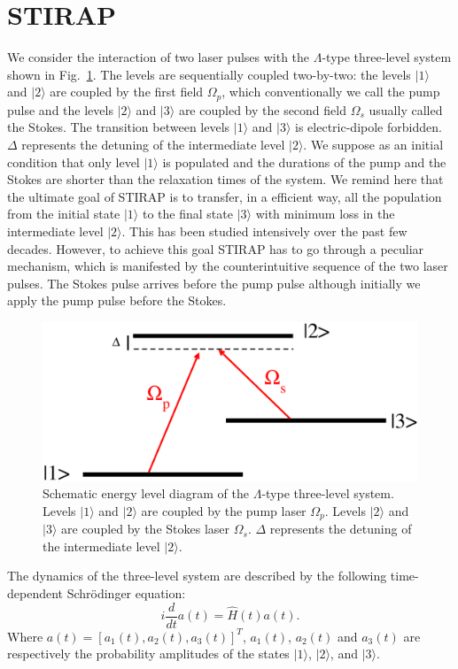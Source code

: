 \documentclass[]{interact}
\theoremstyle{plain}%
\theoremstyle{definition}
\theoremstyle{remark}
\begin{document}
\section{STIRAP}
We consider the interaction of two laser pulses with the $\Lambda$-type 
three-level system shown in Fig.~\ref{fig:lambda_system}. The levels are
sequentially coupled two-by-two: the levels 
$|1\rangle$ and $|2\rangle$ are coupled by the first field  $\Omega_p$, 
which conventionally we call the pump pulse and the levels $|2\rangle$ and 
$|3\rangle$ 
are coupled by the second field  $\Omega_s$ usually called the Stokes. The 
transition between levels $|1\rangle$ and $|3\rangle$ is electric-dipole 
forbidden. $\Delta$ represents the detuning of the intermediate level 
$|2\rangle$. We suppose as an initial condition that only level $|1\rangle$ is 
populated and the durations of the pump and the Stokes are shorter than 
the relaxation times of the system. 
We remind here that the ultimate goal of STIRAP is to transfer, in 
a efficient way, all the population from the initial state $|1\rangle$ to the 
final state 
$|3\rangle$ with minimum loss in 
the intermediate level $|2\rangle$. This has been studied intensively over the 
past few decades. However, to achieve this goal STIRAP has to go 
through a peculiar mechanism, which is manifested by the counterintuitive 
sequence of the two laser pulses. The Stokes pulse arrives before the pump 
pulse although initially we apply the pump pulse before the Stokes.
\begin{figure}[h!]
\centering
\includegraphics[width=0.7\linewidth]{Figure1}
 \caption{Schematic energy level diagram of the $\Lambda$-type three-level 
system. Levels $|1\rangle$ and $|2\rangle$ are coupled by the pump laser 
$\Omega_p$. 
Levels $|2\rangle$ and $|3\rangle$ are coupled by 
the Stokes laser  $\Omega_s$. $\Delta$ represents the detuning of 
the intermediate level $|2\rangle$. \label{fig:lambda_system}}
\end{figure}
The dynamics of the three-level system are described by the 
following time-dependent Schr\"{o}dinger equation: 
\begin{equation}
 i\frac{d}{d t}a(t) = \hat{H}(t) a(t). 
 \label{eq:dynamique}
\end{equation}
Where $a(t)=[a_1(t), a_2(t), a_3(t)]^T$, $a_1(t)$, $a_2(t)$ and $a_3(t)$ are 
respectively the probability amplitudes of the states $|1\rangle$, 
$|2\rangle$, and $|3\rangle$.\ 
\end{document}
